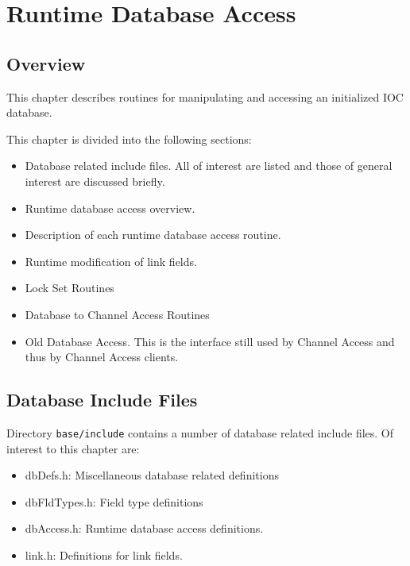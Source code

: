 \chapter{Runtime Database Access}

\section{Overview}

This chapter describes routines for manipulating and accessing an initialized IOC database.

This chapter is divided into the following sections:

\begin{itemize}
\item Database related include files. All of interest are listed and those of general interest are discussed briefly.

\item Runtime database access overview.

\item Description of each runtime database access routine.

\item Runtime modification of link fields.

\item Lock Set Routines

\item Database to Channel Access Routines

\item Old Database Access. This is the interface still used by Channel Access and thus by Channel Access clients.

\end{itemize}

\section{Database Include Files}

Directory \verb|base/include| contains a number of database related include files. Of interest to this chapter are:

\begin{itemize}
\item {}dbDefs.h:  Miscellaneous database related definitions

\item {}dbFldTypes.h: Field type definitions

\item {}dbAccess.h: Runtime database access definitions.

\item {}link.h: Definitions for link fields.

\end{itemize}

